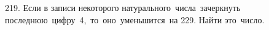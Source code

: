 219. Если в записи некоторого натурального числа зачеркнуть последнюю цифру 4, то оно уменьшится на 229. Найти это число.\\
